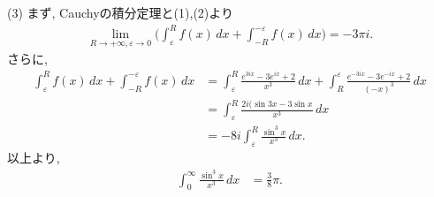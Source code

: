 ﻿\documentclass[../main]{subfiles}
\begin{document}
(3)
  まず, Cauchyの積分定理と(1),(2)より
  \begin{align*}
    \lim_{R\to+\infty, \varepsilon\to 0}
    \biggl(\int_\varepsilon^R f(x)\,dx+\int_{-R}^{-\varepsilon}f(x)\,dx\biggr)
    =-3\pi i.
  \end{align*}
  さらに, 
  \begin{align*}
    \int_\varepsilon^R f(x)\,dx+\int_{-R}^{-\varepsilon}f(x)\,dx
    &=\int_\varepsilon^R \frac{e^{3ix}-3e^{ix}+2}{x^3}\,dx
    +\int_{R}^{\varepsilon}\frac{e^{-3ix}-3e^{-ix}+2}{(-x)^3}\,dx \\
    &=\int_\varepsilon^R \frac{2i(\sin 3x-3\sin x}{x^3}\,dx \\
    &=-8i\int_\varepsilon^R \frac{\sin^3 x}{x^3}\,dx.
  \end{align*}
  以上より, 
  \begin{align*}
    \int_0^\infty \frac{\sin^3 x}{x^3}\,dx
    &=\frac{3}{8}\pi.
  \end{align*}
\end{document}
